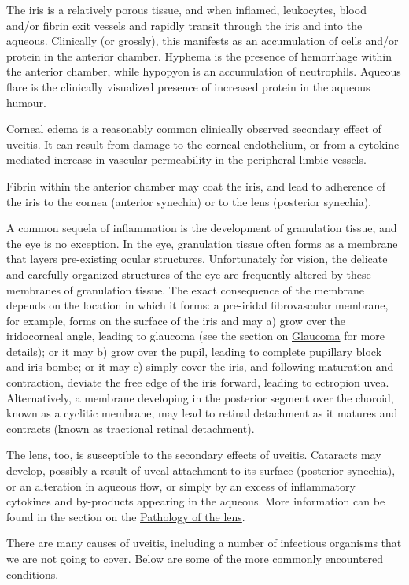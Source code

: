 \documentclass[
  openany]{article}
\begin{document}
The iris is a relatively porous tissue, and when inflamed, leukocytes, blood and/or fibrin exit vessels and rapidly transit through the iris and into the aqueous. Clinically (or grossly), this manifests as an accumulation of cells and/or protein in the anterior chamber. Hyphema is the presence of hemorrhage within the anterior chamber, while hypopyon is an accumulation of neutrophils. Aqueous flare is the clinically visualized presence of increased protein in the aqueous humour.

Corneal edema is a reasonably common clinically observed secondary effect of uveitis. It can result from damage to the corneal endothelium, or from a cytokine-mediated increase in vascular permeability in the peripheral limbic vessels.

Fibrin within the anterior chamber may coat the iris, and lead to adherence of the iris to the cornea (anterior synechia) or to the lens (posterior synechia).

A common sequela of inflammation is the development of granulation tissue, and the eye is no exception. In the eye, granulation tissue often forms as a membrane that layers pre-existing ocular structures. Unfortunately for vision, the delicate and carefully organized structures of the eye are frequently altered by these membranes of granulation tissue. The exact consequence of the membrane depends on the location in which it forms: a pre-iridal fibrovascular membrane, for example, forms on the surface of the iris and may a) grow over the iridocorneal angle, leading to glaucoma (see the section on \protect\hyperlink{glaucoma}{Glaucoma} for more details); or it may b) grow over the pupil, leading to complete pupillary block and iris bombe; or it may c) simply cover the iris, and following maturation and contraction, deviate the free edge of the iris forward, leading to ectropion uvea. Alternatively, a membrane developing in the posterior segment over the choroid, known as a cyclitic membrane, may lead to retinal detachment as it matures and contracts (known as tractional retinal detachment).

The lens, too, is susceptible to the secondary effects of uveitis. Cataracts may develop, possibly a result of uveal attachment to its surface (posterior synechia), or an alteration in aqueous flow, or simply by an excess of inflammatory cytokines and by-products appearing in the aqueous. More information can be found in the section on the \protect\hyperlink{pathology-of-the-lens}{Pathology of the lens}.

There are many causes of uveitis, including a number of infectious organisms that we are not going to cover. Below are some of the more commonly encountered conditions.
\end{document}
